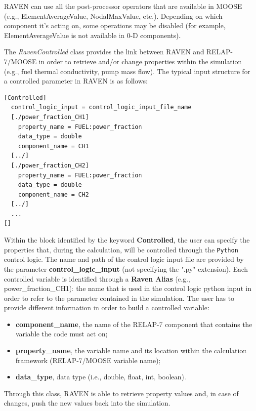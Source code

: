 \documentclass{mc2013}
\begin{document}
RAVEN can use all the post-processor operators that are available in MOOSE (e.g., ElementAverageValue, NodalMaxValue, etc.). Depending on which component it's acting on, some operations may be disabled (for example,  ElementAverageValue is not available in 0-D components).

The \emph{RavenControlled} class provides the link between RAVEN and RELAP-7/MOOSE in order to retrieve and/or change properties within the simulation (e.g., fuel thermal conductivity, pump mass flow). The typical input structure for a controlled parameter in RAVEN is as follows:
\begin{lstlisting}
[Controlled]
  control_logic_input = control_logic_input_file_name
  [./power_fraction_CH1]
    property_name = FUEL:power_fraction
    data_type = double
    component_name = CH1
  [../]
  [./power_fraction_CH2]
    property_name = FUEL:power_fraction
    data_type = double
    component_name = CH2
  [../]
  ...
[]
\end{lstlisting}
Within the block identified by the keyword \textbf{Controlled}, the user can specify the properties that, during the calculation, will be controlled through the \verb!Python! control logic. The name and path of the control logic input file are provided by the parameter  \textbf{control\_logic\_input} (not specifying the ".py" extension). Each controlled variable is identified through a \textbf{Raven Alias} (e.g., power\_fraction\_CH1): the name that is used in the control logic python input in order to refer to the parameter contained in the simulation.
The user has to provide different information in order to build a controlled variable:
\begin{itemize}
  \item \textbf{component\_name}, the name of the RELAP-7 component that contains the variable the code must act on;
  \item \textbf{property\_name}, the variable name and its location within the calculation framework (RELAP-7/MOOSE variable name);
  \item \textbf{data\_type}, data type (i.e., double, float, int, boolean).
\end{itemize}
Through this class, RAVEN is able to retrieve property values and, in case of changes, push the new values back into the simulation. 
\end{document}
